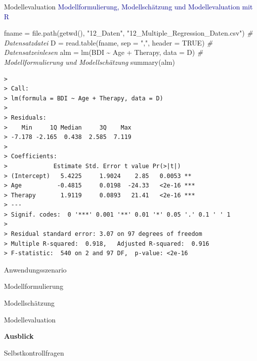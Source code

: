 \documentclass[
  8pt,
  ignorenonframetext,
]{beamer}
\newenvironment{Shaded}{\begin{snugshade}}{\end{snugshade}}
\newcommand{\AttributeTok}[1]{\textcolor[rgb]{0.77,0.63,0.00}{#1}}
\newcommand{\CommentTok}[1]{\textcolor[rgb]{0.56,0.35,0.01}{\textit{#1}}}
\newcommand{\ConstantTok}[1]{\textcolor[rgb]{0.00,0.00,0.00}{#1}}
\newcommand{\FunctionTok}[1]{\textcolor[rgb]{0.00,0.00,0.00}{#1}}
\newcommand{\NormalTok}[1]{#1}
\newcommand{\OtherTok}[1]{\textcolor[rgb]{0.56,0.35,0.01}{#1}}
\newcommand{\SpecialCharTok}[1]{\textcolor[rgb]{0.00,0.00,0.00}{#1}}
\newcommand{\StringTok}[1]{\textcolor[rgb]{0.31,0.60,0.02}{#1}}
\begin{document}
\begin{frame}[fragile]{Modellevaluation}
\protect\hypertarget{modellevaluation-5}{}
\textcolor{darkblue}{Modellformulierung, Modellschätzung und Modellevaluation mit R}
\vspace{2mm}

\tiny
{}

\begin{Shaded}
\begin{Highlighting}[]
\NormalTok{fname  }\OtherTok{=} \FunctionTok{file.path}\NormalTok{(}\FunctionTok{getwd}\NormalTok{(), }\StringTok{"12\_Daten"}\NormalTok{, }\StringTok{"12\_Multiple\_Regression\_Daten.csv"}\NormalTok{) }\CommentTok{\# Datensatzdatei}
\NormalTok{D      }\OtherTok{=} \FunctionTok{read.table}\NormalTok{(fname, }\AttributeTok{sep =} \StringTok{","}\NormalTok{, }\AttributeTok{header =} \ConstantTok{TRUE}\NormalTok{)                        }\CommentTok{\# Datensatzeinlesen}
\NormalTok{alm    }\OtherTok{=} \FunctionTok{lm}\NormalTok{(BDI }\SpecialCharTok{\textasciitilde{}}\NormalTok{ Age }\SpecialCharTok{+}\NormalTok{ Therapy, }\AttributeTok{data =}\NormalTok{ D)                                  }\CommentTok{\# Modellformulierung und Modellschätzung}
\FunctionTok{summary}\NormalTok{(alm)}
\end{Highlighting}
\end{Shaded}

\begin{verbatim}
> 
> Call:
> lm(formula = BDI ~ Age + Therapy, data = D)
> 
> Residuals:
>    Min     1Q Median     3Q    Max 
> -7.178 -2.165  0.438  2.585  7.119 
> 
> Coefficients:
>             Estimate Std. Error t value Pr(>|t|)    
> (Intercept)   5.4225     1.9024    2.85   0.0053 ** 
> Age          -0.4815     0.0198  -24.33   <2e-16 ***
> Therapy       1.9119     0.0893   21.41   <2e-16 ***
> ---
> Signif. codes:  0 '***' 0.001 '**' 0.01 '*' 0.05 '.' 0.1 ' ' 1
> 
> Residual standard error: 3.07 on 97 degrees of freedom
> Multiple R-squared:  0.918,   Adjusted R-squared:  0.916 
> F-statistic:  540 on 2 and 97 DF,  p-value: <2e-16
\end{verbatim}
\end{frame}

\begin{frame}{}
\protect\hypertarget{section-8}{}
\large
{}
\vfill

Anwendungsszenario

Modellformulierung

Modellschätzung

Modellevaluation

\textbf{Ausblick}

Selbstkontrollfragen \vfill
\end{frame}
\end{document}

